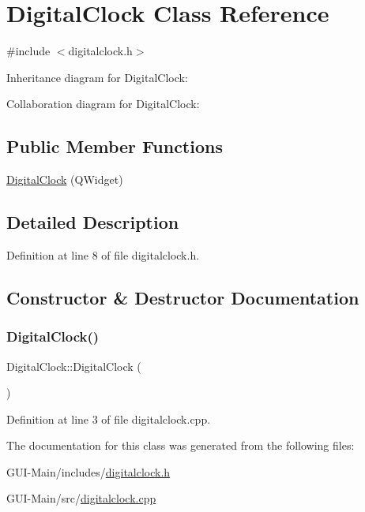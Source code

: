 \hypertarget{classDigitalClock}{}\section{Digital\+Clock Class Reference}
\label{classDigitalClock}


{\ttfamily \#include $<$digitalclock.\+h$>$}



Inheritance diagram for Digital\+Clock\+:


Collaboration diagram for Digital\+Clock\+:
\subsection*{Public Member Functions}
\begin{DoxyCompactItemize}
\item 
\hyperlink{classDigitalClock_a4c34760688319cd987af2443b25360e8}{Digital\+Clock} (Q\+Widget)
\end{DoxyCompactItemize}


\subsection{Detailed Description}


Definition at line 8 of file digitalclock.\+h.



\subsection{Constructor \& Destructor Documentation}
\mbox{\label{classDigitalClock_a4c34760688319cd987af2443b25360e8}} 
\subsubsection{\texorpdfstring{Digital\+Clock()}{DigitalClock()}}
{\footnotesize\ttfamily Digital\+Clock\+::\+Digital\+Clock (\begin{DoxyParamCaption}\item[{Q\+Widget}]{ }\end{DoxyParamCaption})}



Definition at line 3 of file digitalclock.\+cpp.



The documentation for this class was generated from the following files\+:\begin{DoxyCompactItemize}
\item 
G\+U\+I-\/\+Main/includes/\hyperlink{digitalclock_8h}{digitalclock.\+h}\item 
G\+U\+I-\/\+Main/src/\hyperlink{digitalclock_8cpp}{digitalclock.\+cpp}\end{DoxyCompactItemize}
